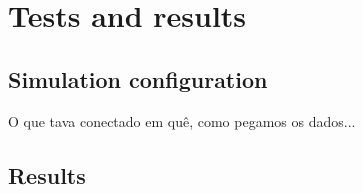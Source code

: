 \chapter{Tests and results}

\section{Simulation configuration} 
O que tava conectado em quê, como pegamos os dados...

\section{Results}



